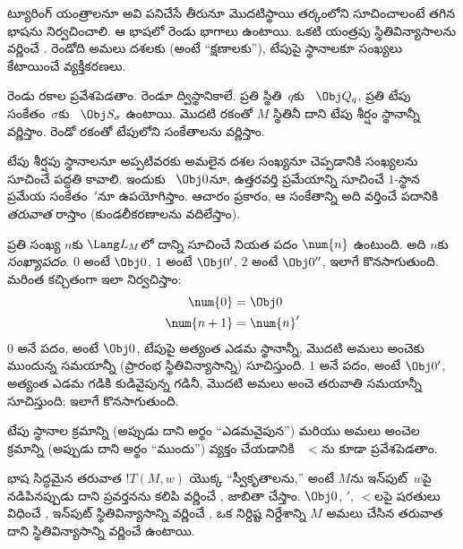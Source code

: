\documentclass[../../../include/open-logic-section]{subfiles}
\begin{document}

\begin{explain}
ట్యూరింగ్ యంత్రాలనూ అవి పనిచేసే తీరునూ మొదటిస్థాయి తర్కంలోని
 సూచించాలంటే తగిన భాషను నిర్వచించాలి.
ఆ భాషలో రెండు భాగాలు ఉంటాయి. ఒకటి యంత్రపు స్థితివిన్యాసాలను వర్ణించే
. రెండోది అమలు దశలకు (అంటే ``క్షణాలకు''),
టేపుపై స్థానాలకూ సంఖ్యలు కేటాయించే వ్యక్తీకరణలు.

రెండు రకాల  ప్రవేశపెడతాం. రెండూ ద్విస్థానికాలే.
ప్రతి స్థితి~$q$కు ~$\Obj Q_q$, ప్రతి టేపు
సంకేతం~$\sigma$కు ~$\Obj S_\sigma$ ఉంటాయి.
మొదటి రకంతో $M$ స్థితినీ దాని టేపు శీర్షం స్థానాన్నీ వర్ణిస్తాం. రెండో
రకంతో టేపులోని సంకేతాలను వర్ణిస్తాం.

టేపు శీర్షపు స్థానాలనూ అప్పటివరకు అమలైన దశల సంఖ్యనూ చెప్పడానికి సంఖ్యలను సూచించే
పద్ధతి కావాలి. ఇందుకు ~$\Obj 0$నూ, ఉత్తరవర్తి
ప్రమేయాన్ని సూచించే $1$-స్థాన ప్రమేయ సంకేతం~$\prime$నూ ఉపయోగిస్తాం. ఆచారం ప్రకారం,
ఆ సంకేతాన్ని అది వర్తించే పదానికి \emph{తరువాత} రాస్తాం (కుండలీకరణాలను
వదిలేస్తాం).

ప్రతి సంఖ్య $n$కు $\Lang L_M$లో దాన్ని సూచించే నియత పదం
$\num{n}$ ఉంటుంది. అది $n$కు \emph{సంఖ్యాపదం}. $\num{0}$ అంటే $\Obj 0$,
$\num{1}$ అంటే $\Obj 0'$, $\num{2}$ అంటే $\Obj 0''$, ఇలాగే కొనసాగుతుంది.
మరింత కచ్చితంగా ఇలా నిర్వచిస్తాం:
\begin{align*}
\num{0} & = \Obj 0 \\
\num{n+1} &= \num{n}'
\end{align*}
$\num{0}$ అనే పదం, అంటే $\Obj 0$, టేపుపై అత్యంత ఎడమ స్థానాన్నీ, మొదటి
అమలు అంచెకు ముందున్న సమయాన్నీ (ప్రారంభ స్థితివిన్యాసాన్ని) సూచిస్తుంది.
$\num{1}$ అనే పదం, అంటే $\Obj 0'$, అత్యంత ఎడమ గడికి కుడివైపున్న గడినీ,
మొదటి అమలు అంచె తరువాతి సమయాన్నీ సూచిస్తుంది; ఇలాగే కొనసాగుతుంది.

టేపు స్థానాల క్రమాన్ని (అప్పుడు దాని అర్థం ``ఎడమవైపున'') మరియు అమలు అంచెల
క్రమాన్ని (అప్పుడు దాని అర్థం ``ముందు'') వ్యక్తం చేయడానికి ~$<$ను
కూడా ప్రవేశపెడతాం.

భాష సిద్ధమైన తరువాత $!T(M,w)$ యొక్క ``స్వీకృతాలను,'' అంటే $M$ను ఇన్‌పుట్~$w$పై
నడిపినప్పుడు దాని ప్రవర్తనను కలిపి వర్ణించే , జాబితా చేస్తాం.
$\Obj 0$, $\prime$, $<$లపై షరతులు విధించే , ఇన్‌పుట్
స్థితివిన్యాసాన్ని వర్ణించే , ఒక నిర్దిష్ట నిర్దేశాన్ని $M$
అమలు చేసిన తరువాత దాని స్థితివిన్యాసాన్ని వర్ణించే  ఉంటాయి.
\end{explain}
\end{document}
